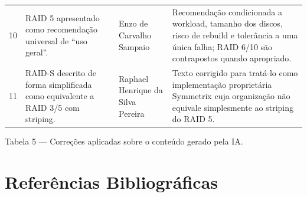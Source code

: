 \documentclass[11pt,a4paper]{article}
\begin{document}
\begin{longtable}{@{}p{.7cm}p{5cm}p{4.4cm}p{4.6cm}@{}}
10 & RAID 5 apresentado como recomendação universal de ``uso geral''. & Enzo de Carvalho Sampaio & Recomendação condicionada a workload, tamanho dos discos, risco de rebuild e tolerância a uma única falha; RAID 6/10 são contrapostos quando apropriado.\\
11 & RAID-S descrito de forma simplificada como equivalente a RAID 3/5 com striping. & Raphael Henrique da Silva Pereira & Texto corrigido para tratá-lo como implementação proprietária Symmetrix cuja organização não equivale simplesmente ao striping do RAID 5.\\\bottomrule
\end{longtable}
Tabela 5 --- Correções aplicadas sobre o conteúdo gerado pela IA.

\section{Referências Bibliográficas}
\end{document}
